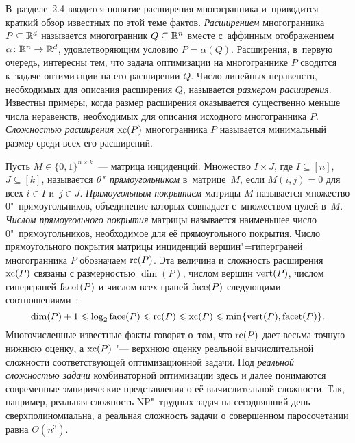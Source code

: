 В~разделе~2.4 вводится понятие расширения многогранника и~приводится краткий обзор известных по этой теме фактов. \emph{Расширением} многогранника $P \subseteq \mathbb{R}^d$ называется многогранник $Q \subseteq \mathbb{R}^n$ вместе с~аффинным отображением $\alpha \colon \mathbb{R}^n \to \mathbb{R}^d$, удовлетворяющим условию $P = \alpha(Q)$.
Расширения, в~первую очередь, интересны тем, что задача оптимизации на многограннике $P$ сводится к~задаче оптимизации на его расширении $Q$.
Число линейных неравенств, необходимых для описания расширения $Q$, называется \emph{размером расширения}. Известны примеры, когда размер расширения оказывается существенно меньше числа неравенств, необходимых для описания исходного многогранника $P$. \emph{Сложностью расширения} $\operatorname{xc}(P)$ многогранника $P$ называется минимальный размер среди всех его расширений. 


Пусть $M \in \{0,1\}^{n\times k}$~--- матрица инциденций.
Множество $I\times J$, где $I\subseteq [n]$, $J\subseteq [k]$, называется \emph{0"~прямоугольником} в~матрице~$M$, если $M(i,j) = 0$ для всех $i\in I$ и~$j\in J$.
\emph{Прямоугольным покрытием} матрицы $M$ называется множество 0"~прямоугольников, объединение которых 
совпадает с~множеством нулей в~$M$.
\emph{Числом прямоугольного покрытия} матрицы называется наименьшее число 0"~прямоугольников, необходимое для её прямоугольного покрытия.
Число прямоугольного покрытия матрицы инциденций вершин"=гиперграней  многогранника $P$ обозначаем $\operatorname{rc}(P)$.
Эта величина и сложность расширения $\operatorname{xc}(P)$ связаны с размерностью $\dim(P)$, числом вершин $\operatorname{vert}(P)$, числом гиперграней $\operatorname{facet}(P)$ и числом всех граней $\operatorname{face}(P)$ следующими соотношениями~\cite{Yannakakis:1988,FioriniKPT:13}:
\[
\dim(P) + 1 \leqslant \log_2 \operatorname{face}(P) \leqslant \operatorname{rc}(P) \leqslant \operatorname{xc}(P) \leqslant \min\{\operatorname{vert}(P), \operatorname{facet}(P)\}.
\]
Многочисленные известные факты говорят о~том, что $\operatorname{rc}(P)$ дает весьма точную нижнюю оценку, а $\operatorname{xc}(P)$ "--- верхнюю оценку реальной вычислительной сложности соответствующей оптимизационной задачи.
Под \emph{реальной сложностью задачи} комбинаторной оптимизации здесь и далее понимаются современные эмпирические представления о её вычислительной сложности. Так, например, реальная сложность NP"~трудных задач на сегодняшний день сверхполиномиальна, а реальная сложность задачи о совершенном паросочетании равна $\Theta(n^3)$.

